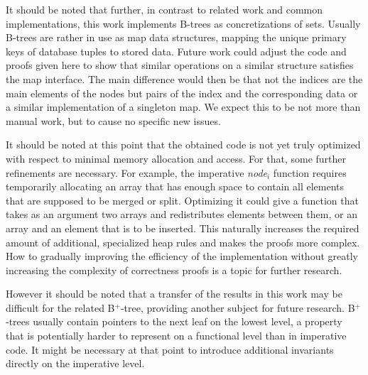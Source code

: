 It should be noted that further,
in contrast to related work and common implementations,
this work implements B-trees as concretizations of sets.
Usually B-trees are rather in use as map data structures,
mapping the unique primary keys
of database tuples to stored data.
Future work could adjust the code and proofs given here
to show that similar operations on a similar structure satisfies
the map interface.
The main difference would then be that not the indices
are the main elements of the nodes but pairs of the 
index and the corresponding data or a similar
implementation of a singleton map.
We expect this to be not more than manual work,
but to cause no specific new issues.

It should be noted at this point that the obtained code is not yet
truly optimized with respect to minimal memory allocation and access.
For that, some further refinements are necessary.
For example, the imperative \textit{node$_i$} function
requires temporarily allocating
an array that has enough space to contain
all elements that are supposed to be merged or split.
Optimizing it could give a function that takes
as an argument two arrays and redistributes elements between them,
or an array and an element that is to be inserted.
This naturally increases the required amount of additional,
specialized heap rules and makes the proofs more complex.
How to gradually improving the efficiency of the implementation
without greatly increasing the complexity of correctness
proofs is a topic for further research.


However it should be noted that a transfer of the results in
this work may be difficult for the related B$^+$-tree,
providing another subject for future research.
B$^+$-trees usually contain pointers to the next leaf
on the lowest level, a property that is potentially harder
to represent on a functional level than in imperative code.
It might be necessary at that point to introduce additional
invariants directly on the imperative level.
